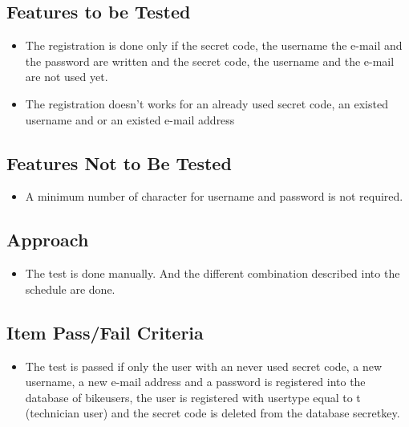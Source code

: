\documentclass{article}
\begin{document}
\subsection{Features to be Tested}
\begin{itemize}
    \item The registration is done only if the secret code, the username the e-mail and the password are written and the secret code, the username and the e-mail are not used  yet.
    \item The registration doesn’t works for an already used secret code, an existed username and or an existed e-mail address
\end{itemize}
\subsection{Features Not to Be Tested}
\begin{itemize}
    \item A minimum number of character for username and password is not required. 
\end{itemize}
\subsection{Approach}
\begin{itemize}
    \item The test is done manually. And the different combination described into the schedule are done. 
\end{itemize}
\subsection{Item Pass/Fail Criteria}
\begin{itemize}
    \item The test is passed if only the user with an never used secret code, a new username, a new e-mail address and a password is registered into the database of bike\textunderscore users, the user is registered with user\textunderscore type equal to t (technician user) and the secret code is deleted from the database secret\textunderscore key.
   \end{itemize}
\end{document}
